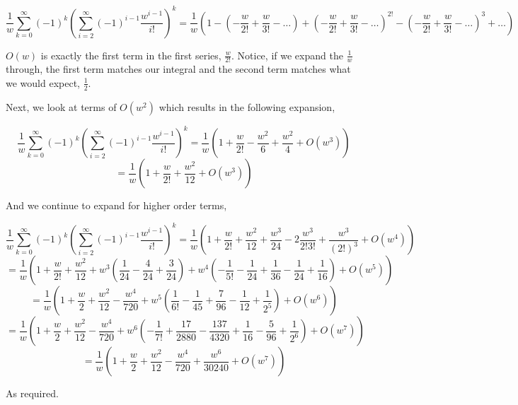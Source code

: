 \documentclass[11pt]{article}
\begin{document}
$$ \frac{1}{w}\sum_{k=0}^{\infty}(-1)^{k}\left(\sum_{i=2}^{\infty}(-1)^{i-1}\frac{w^{i-1}}{i!}\right)^{k} = \frac{1}{w} \left( 1 - \left(-\frac{w}{2!} + \frac{w}{3!} - \dots \right) + \left(-\frac{w}{2!} + \frac{w}{3!} - \dots \right)^{2!} - \left(-\frac{w}{2!} + \frac{w}{3!} - \dots \right)^{3} + \dots \right)$$

$O(w)$ is exactly the first term in the first series, $\frac{w}{2!}$. Notice, if we expand the $\frac{1}{w}$ through, the first term matches our integral and the second term matches what we would expect, $\frac{1}{2}$.

Next, we look at terms of $O(w^{2})$ which results in the following expansion,

$$ \frac{1}{w}\sum_{k=0}^{\infty}(-1)^{k}\left(\sum_{i=2}^{\infty}(-1)^{i-1}\frac{w^{i-1}}{i!}\right)^{k} = \frac{1}{w} \left( 1 + \frac{w}{2!} - \frac{w^{2}}{6} + \frac{w^{2}}{4} + O(w^{3}) \right) $$
$$ =  \frac{1}{w} \left( 1 + \frac{w}{2!} + \frac{w^{2}}{12} + O(w^{3}) \right) $$

And we continue to expand for higher order terms,

$$ \frac{1}{w}\sum_{k=0}^{\infty}(-1)^{k}\left(\sum_{i=2}^{\infty}(-1)^{i-1}\frac{w^{i-1}}{i!}\right)^{k} =  \frac{1}{w} \left( 1 + \frac{w}{2!} + \frac{w^{2}}{12} + \frac{w^{3}}{24} - 2\frac{w^{3}}{2!3!} + \frac{w^{3}}{(2!)^{3}} + O(w^{4}) \right)$$
$$ =  \frac{1}{w} \left( 1 + \frac{w}{2!} + \frac{w^{2}}{12} + w^{3}\left(\frac{1}{24} - \frac{4}{24} + \frac{3}{24} \right)+ w^{4}\left(-\frac{1}{5!} - \frac{1}{24} + \frac{1}{36} - \frac{1}{24} + \frac{1}{16} \right)+ O(w^{5}) \right) $$
$$ = \frac{1}{w} \left(1 + \frac{w}{2} + \frac{w^{2}}{12} - \frac{w^{4}}{720} + w^{5}\left(\frac{1}{6!} - \frac{1}{45} + \frac{7}{96} - \frac{1}{12} + \frac{1}{2^{5}} \right) + O(w^{6})\right)$$
$$ = \frac{1}{w} \left(1 + \frac{w}{2} + \frac{w^{2}}{12} - \frac{w^{4}}{720} + w^{6} \left(-\frac{1}{7!} + \frac{17}{2880} - \frac{137}{4320} + \frac{1}{16} - \frac{5}{96} + \frac{1}{2^{6}} \right) + O(w^{7})\right)$$
$$ = \frac{1}{w} \left(1 + \frac{w}{2} + \frac{w^{2}}{12} - \frac{w^{4}}{720} + \frac{w^{6}}{30240} + O(w^{7})\right)$$

As required.
\end{document}
